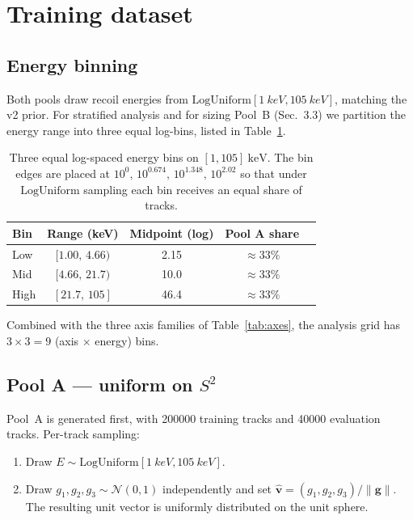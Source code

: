 \documentclass[11pt]{article}
\begin{document}
\section{Training dataset}

\subsection{Energy binning}

Both pools draw recoil energies from
$\mathrm{LogUniform}[\SI{1}{keV}, \SI{105}{keV}]$, matching the v2 prior.
For stratified analysis and for sizing Pool~B (Sec.~3.3) we partition the energy
range into three equal log-bins, listed in Table~\ref{tab:ebins}.

\begin{table}[h]
  \centering
  \begin{tabular}{lcccc}
    \toprule
    Bin   & Range (keV)        & Midpoint (log) & Pool A share \\
    \midrule
    Low   & $[1.00,\,4.66)$    & 2.15           & $\approx 33\%$ \\
    Mid   & $[4.66,\,21.7)$    & 10.0           & $\approx 33\%$ \\
    High  & $[21.7,\,105]$     & 46.4           & $\approx 33\%$ \\
    \bottomrule
  \end{tabular}
  \caption{Three equal log-spaced energy bins on $[1, 105]~\mathrm{keV}$. The
    bin edges are placed at $10^{0},\,10^{0.674},\,10^{1.348},\,10^{2.02}$ so
    that under $\mathrm{LogUniform}$ sampling each bin receives an equal share
    of tracks.}
  \label{tab:ebins}
\end{table}

Combined with the three axis families of Table~\ref{tab:axes}, the analysis
grid has $3 \times 3 = 9$ (axis $\times$ energy) bins.

\subsection{Pool A --- uniform on $S^2$}

Pool~A is generated first, with \num{200000} training tracks and \num{40000}
evaluation tracks. Per-track sampling:
\begin{enumerate}
  \item Draw $E \sim \mathrm{LogUniform}[\SI{1}{keV}, \SI{105}{keV}]$.
  \item Draw $g_1, g_2, g_3 \sim \mathcal{N}(0,1)$ independently and set
        $\hat{\mathbf{v}} = (g_1, g_2, g_3)/\|\mathbf{g}\|$. The resulting unit
        vector is uniformly distributed on the unit sphere.
\end{enumerate}
\end{document}
